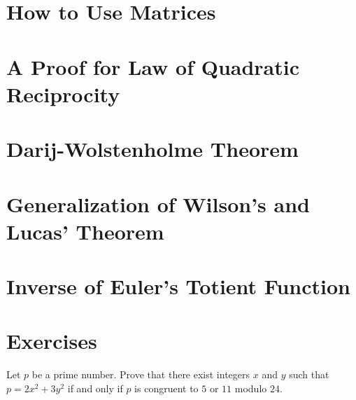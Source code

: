 \documentclass{subfile}
\begin{document}
	
		
	\section{How to Use Matrices}
		


	\section{A Proof for Law of Quadratic Reciprocity}\label{sec:qrlawproof}
	
	
	\section{Darij-Wolstenholme Theorem}
	
	
	\section{Generalization of Wilson's and Lucas' Theorem}\label{sec:wilsongeneral}
	
	
	\section{Inverse of Euler's Totient Function}
	
	
	\newpage
	\section{Exercises}
	\begin{problem} %
		Let $p$ be a prime number. Prove that there exist integers $x$ and $y$ such that $p=2x^2+3y^2$ if and only if $p$ is congruent to $5$ or $11$ modulo $24$.
	\end{problem}
	
\end{document}
